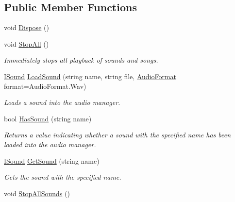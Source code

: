 \subsection*{Public Member Functions}
\begin{DoxyCompactItemize}
\item 
void \hyperlink{class_tri_devs_1_1_tri_engine_1_1_audio_1_1_null_audio_manager_a27acda8926936368af575b81508593a7}{Dispose} ()
\item 
void \hyperlink{class_tri_devs_1_1_tri_engine_1_1_audio_1_1_null_audio_manager_a3197a224b44381d1cfe0f49eeed8857e}{Stop\-All} ()
\begin{DoxyCompactList}\small\item\em Immediately stops all playback of sounds and songs. \end{DoxyCompactList}\item 
\hyperlink{interface_tri_devs_1_1_tri_engine_1_1_audio_1_1_i_sound}{I\-Sound} \hyperlink{class_tri_devs_1_1_tri_engine_1_1_audio_1_1_null_audio_manager_ab1e595366496dcad31999c46ff47c848}{Load\-Sound} (string name, string file, \hyperlink{namespace_tri_devs_1_1_tri_engine_1_1_audio_a3e1817498a8306afd084903a967537ef}{Audio\-Format} format=Audio\-Format.\-Wav)
\begin{DoxyCompactList}\small\item\em Loads a sound into the audio manager. \end{DoxyCompactList}\item 
bool \hyperlink{class_tri_devs_1_1_tri_engine_1_1_audio_1_1_null_audio_manager_a3a3bb777fe152fa7eb799150d7bad261}{Has\-Sound} (string name)
\begin{DoxyCompactList}\small\item\em Returns a value indicating whether a sound with the specified name has been loaded into the audio manager. \end{DoxyCompactList}\item 
\hyperlink{interface_tri_devs_1_1_tri_engine_1_1_audio_1_1_i_sound}{I\-Sound} \hyperlink{class_tri_devs_1_1_tri_engine_1_1_audio_1_1_null_audio_manager_a8eaf28bb1ee2e97cdeaa1ee765fa034d}{Get\-Sound} (string name)
\begin{DoxyCompactList}\small\item\em Gets the sound with the specified name. \end{DoxyCompactList}\item 
void \hyperlink{class_tri_devs_1_1_tri_engine_1_1_audio_1_1_null_audio_manager_affd5c4417d4d49c6a1b3a139ad7b10d2}{Stop\-All\-Sounds} ()

\end{DoxyCompactItemize}

